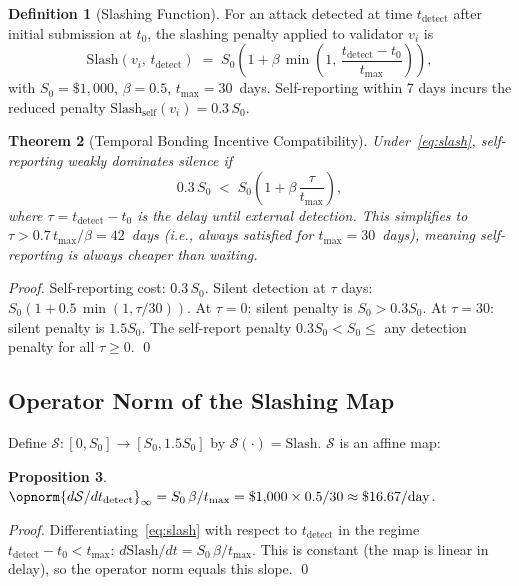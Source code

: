 \documentclass[12pt,a4paper]{article}
\newtheorem{theorem}{Theorem}[section]
\newtheorem{proposition}[theorem]{Proposition}
\theoremstyle{definition}
\newtheorem{definition}[theorem]{Definition}
\theoremstyle{remark}
\begin{document}
\begin{definition}[Slashing Function]
For an attack detected at time $t_{\text{detect}}$ after initial submission at $t_0$,
the slashing penalty applied to validator $v_i$ is
\begin{equation}
  \mathrm{Slash}(v_i,\,t_{\text{detect}})
  \;=\; S_0\!\left(1 + \beta\,\min\!\left(1,\,\frac{t_{\text{detect}}-t_0}{t_{\max}}\right)\right),
  \label{eq:slash}
\end{equation}
with $S_0=\$1{,}000$, $\beta=0.5$, $t_{\max}=30$~days.
Self-reporting within 7 days incurs the reduced penalty
$\mathrm{Slash}_{\text{self}}(v_i) = 0.3\,S_0$.
\end{definition}

\begin{theorem}[Temporal Bonding Incentive Compatibility]
\label{thm:incentive}
Under~\eqref{eq:slash}, self-reporting weakly dominates silence if
\begin{equation}
  0.3\,S_0 \;<\; S_0\!\left(1 + \beta\,\frac{\tau}{t_{\max}}\right),
\end{equation}
where $\tau = t_{\text{detect}}-t_0$ is the delay until external detection.
This simplifies to $\tau > 0.7\,t_{\max}/\beta = 42$~days (i.e., always satisfied
for $t_{\max}=30$~days), meaning self-reporting is always cheaper than waiting.
\end{theorem}

\begin{proof}
Self-reporting cost: $0.3\,S_0$.
Silent detection at $\tau$ days: $S_0(1+0.5\,\min(1,\tau/30))$.
At $\tau=0$: silent penalty is $S_0 > 0.3S_0$. At $\tau=30$: silent penalty is $1.5S_0$.
The self-report penalty $0.3S_0 < S_0 \le$ any detection penalty for all $\tau\ge 0$. \qed
\end{proof}

\subsection{Operator Norm of the Slashing Map}

Define $\mathcal{S}: [0,S_0]\to[S_0, 1.5S_0]$ by $\mathcal{S}(\cdot)=\mathrm{Slash}$.
$\mathcal{S}$ is an affine map:

\begin{proposition}
$\opnorm{d\mathcal{S}/dt_{\text{detect}}}_\infty = S_0\,\beta/t_{\max} = \$1{,}000\times0.5/30 \approx \$16.67\text{/day}$.
\end{proposition}

\begin{proof}
Differentiating~\eqref{eq:slash} with respect to $t_{\text{detect}}$ in the regime
$t_{\text{detect}}-t_0 < t_{\max}$:
$d\mathrm{Slash}/dt = S_0\,\beta/t_{\max}$.
This is constant (the map is linear in delay), so the operator norm equals this slope. \qed
\end{proof}
\end{document}
